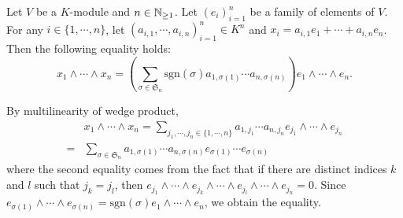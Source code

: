 \begin{propositionenv}\label{prop:4.5.1}
    Let $V$ be a $K$-module and $n\in \mathbb{N}_{\ge 1}$.
    Let $(e_i)_{i=1}^n$ be a family of elements of $V$.
    For any $i \in \{1,\cdots,n\}$, let $\left(a_{i,1}, \cdots, a_{i,n}\right)_{i=1}^{n} \in K^n$
    and $x_i = a_{i,1} e_1 + \cdots + a_{i,n} e_n$.
    Then the following equality holds:
    $$ x_1 \wedge \cdots \wedge x_n = \left(\sum_{\sigma \in \mathfrak{S}_n} \mathrm{sgn}(\sigma) a_{1,\sigma(1)} \cdots a_{n,\sigma(n)}\right)e_1 \wedge \cdots \wedge e_n.$$
\end{propositionenv}
\begin{proofenv}
    By multilinearity of wedge product, 
    $$\begin{aligned}
        & x_1 \wedge \cdots \wedge x_n = \sum_{j_1,\cdots,j_n \in \{1,\cdots,n\}} a_{1,j_1} \cdots a_{n,j_n} e_{j_1} \wedge \cdots \wedge e_{j_n}\\
        =& \sum_{\sigma \in \mathfrak{S}_n} a_{1,\sigma(1)} \cdots a_{n,\sigma(n)} e_{\sigma(1)} \cdots e_{\sigma(n)}
    \end{aligned}$$
    where the second equality comes from the fact that if there are distinct indices $k$ and $l$ such that $j_{k} = j_{l}$, then $e_{j_1} \wedge \cdots \wedge e_{j_k} \wedge \cdots \wedge e_{j_l} \wedge \cdots \wedge e_{j_n} = 0$.
    Since $e_{\sigma(1)} \wedge \cdots \wedge e_{\sigma(n)} = \mathrm{sgn} (\sigma) e_1 \wedge \cdots \wedge e_n$, we obtain the equality.
\end{proofenv}

